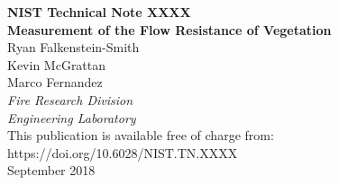 \documentclass[12pt]{article}
\newcommand{\pubnumber}{XXXX}
\newcommand{\DOI}{https://doi.org/10.6028/NIST.TN.XXXX}
\newcommand{\monthyear}{September 2018}
\begin{document}
\newpage

\hspace{5in}

\newpage

\begin{titlepage}
\begin{flushright}
\LARGE{\textbf{NIST Technical Note \pubnumber}}\\
\vfill
\Huge{\textbf{Measurement of the Flow Resistance of Vegetation}}\\
\vfill
\normalsize Ryan Falkenstein-Smith\\
Kevin McGrattan\\
Marco Fernandez\\
\textit{Fire Research Division}\\
\textit{Engineering Laboratory}\\
\vspace{12pt}
\vfill
\normalsize This publication is available free of charge from:\\
\DOI\\
\vfill
\normalsize \monthyear
\vfill


\end{flushright}
\end{titlepage}
\end{document}
